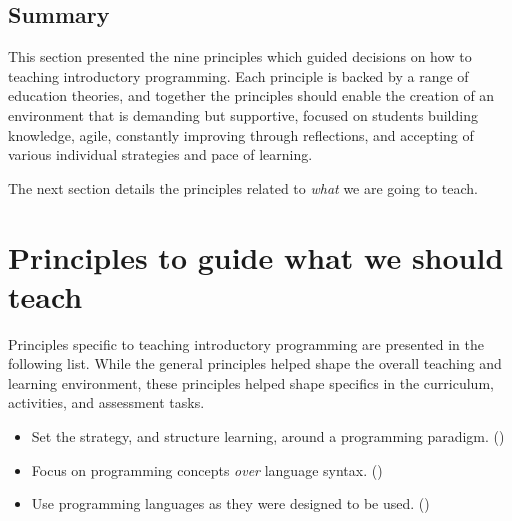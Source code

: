 



\subsection{Summary} %
\label{ssub:summary_of_principles_on_how_to_teach}

This section presented the nine principles which guided decisions on how to teaching introductory programming. Each principle is backed by a range of education theories, and together the principles should enable the creation of an environment that is demanding but supportive, focused on students building knowledge, agile, constantly improving through reflections, and accepting of various individual strategies and pace of learning.

The next section details the principles related to \emph{what} we are going to teach.









\clearpage
\section{Principles to guide what we should teach} %
\label{sec:principles_to_guide_what_we_should_cover}

Principles specific to teaching introductory programming are presented in the following list. While the general principles helped shape the overall teaching and learning environment, these principles helped shape specifics in the curriculum, activities, and assessment tasks.
\begin{itemize}[noitemsep,nolistsep]
	\item Set the strategy, and structure learning, around a programming paradigm. ()
	\item Focus on programming concepts \emph{over} language syntax. ()
	\item Use programming languages as they were designed to be used. ()
\end{itemize}


